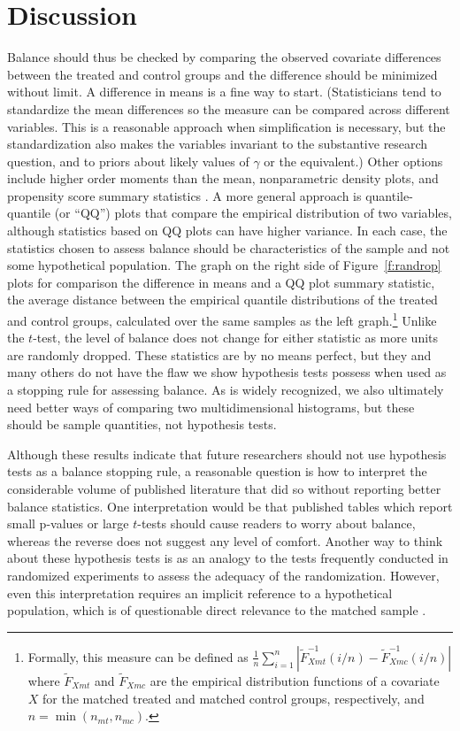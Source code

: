 \documentclass[11pt,titlepage]{article}
\begin{document}
\section{Discussion}
Balance should thus be checked by comparing the observed covariate
differences between the treated and control groups and the difference
should be minimized without limit.  A difference in means is a fine
way to start.  (Statisticians tend to standardize the mean differences
so the measure can be compared across different variables.  This is a
reasonable approach when simplification is necessary, but the
standardization also makes the variables invariant to the substantive
research question, and to priors about likely values of $\gamma$ or
the equivalent.) Other options include higher order moments than the
mean, nonparametric density plots, and propensity score summary
statistics \citep{AusMam06, Hansen04, Rubin01}. A more general
approach is quantile-quantile (or ``QQ'') plots that compare the
empirical distribution of two variables, although statistics based on
QQ plots can have higher variance.  In each case, the statistics
chosen to assess balance should be characteristics of the sample and
not some hypothetical population.  The graph on the right side of
Figure~\ref{f:randrop} plots for comparison the difference in means
and a QQ plot summary statistic, the average distance between the
empirical quantile distributions of the treated and control groups,
calculated over the same samples as the left graph.\footnote{Formally,
  this measure can be defined as $\frac{1}{n} \sum_{i=1}^n
  |\widetilde{F}_{Xmt}^{-1}(i/n) - \widetilde{F}^{-1}_{Xmc}(i/n)|$
  where $\widetilde{F}_{Xmt}$ and $\widetilde{F}_{Xmc}$ are the
  empirical distribution functions of a covariate $X$ for the matched
  treated and matched control groups, respectively, and
  $n=\min(n_{mt},n_{mc})$.}  Unlike the $t$-test, the level of balance
does not change for either statistic as more units are randomly
dropped.  These statistics are by no means perfect, but they and many
others do not have the flaw we show hypothesis tests possess when used
as a stopping rule for assessing balance.  As is widely recognized, we
also ultimately need better ways of comparing two multidimensional
histograms, but these should be sample quantities, not hypothesis
tests.

Although these results indicate that future researchers should not use
hypothesis tests as a balance stopping rule, a reasonable question is
how to interpret the considerable volume of published literature that
did so without reporting better balance statistics.  One
interpretation would be that published tables which report small
p-values or large $t$-tests should cause readers to worry about
balance, whereas the reverse does not suggest any level of comfort.
Another way to think about these hypothesis tests is as an analogy to the
tests frequently conducted in randomized experiments to assess the adequacy of 
the randomization. However, even this
interpretation requires an implicit reference to a hypothetical population,
which is of questionable direct relevance to the matched sample \citep{Cochran65}.
\\


\baselineskip\normalsize 


\end{document}
